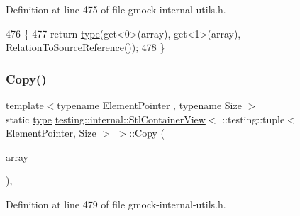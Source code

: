 Definition at line 475 of file gmock-\/internal-\/utils.\+h.


\begin{DoxyCode}
476                                                        \{
477     \textcolor{keywordflow}{return} \hyperlink{classtesting_1_1internal_1_1StlContainerView_3_01_1_1testing_1_1tuple_3_01ElementPointer_00_01Size_01_4_01_4_aedefb897170f76518afbca6f87b5467c}{type}(get<0>(array), get<1>(array), RelationToSourceReference());
478   \}
\end{DoxyCode}
\mbox{\label{classtesting_1_1internal_1_1StlContainerView_3_01_1_1testing_1_1tuple_3_01ElementPointer_00_01Size_01_4_01_4_a3d42db21a2f88d407a4b5acbb7fe252c}} 
\subsubsection{\texorpdfstring{Copy()}{Copy()}}
{\footnotesize\ttfamily template$<$typename Element\+Pointer , typename Size $>$ \\
static \hyperlink{classtesting_1_1internal_1_1StlContainerView_3_01_1_1testing_1_1tuple_3_01ElementPointer_00_01Size_01_4_01_4_aedefb897170f76518afbca6f87b5467c}{type} \hyperlink{classtesting_1_1internal_1_1StlContainerView}{testing\+::internal\+::\+Stl\+Container\+View}$<$ \+::testing\+::tuple$<$ Element\+Pointer, Size $>$ $>$\+::Copy (\begin{DoxyParamCaption}\item[{const \+::testing\+::tuple$<$ Element\+Pointer, Size $>$ \&}]{array }\end{DoxyParamCaption})\hspace{0.3cm}{\ttfamily [inline]}, {\ttfamily [static]}}



Definition at line 479 of file gmock-\/internal-\/utils.\+h.


